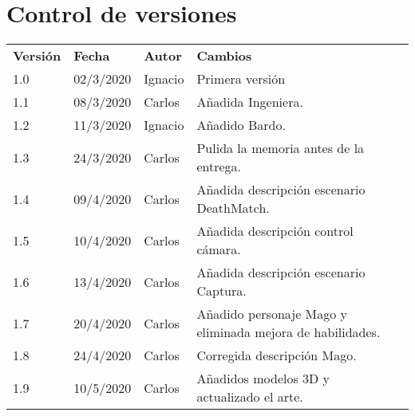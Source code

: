 \chapter{Control de versiones}
\begin{table}[h]
	\centering
	\begin{tabular}{lllll}
		\cline{1-4}
		\multicolumn{1}{|l}{\cellcolor[HTML]{C0C0C0}\textbf{Versión}} & \cellcolor[HTML]{C0C0C0}\textbf{Fecha} & \cellcolor[HTML]{C0C0C0}\textbf{Autor} & \multicolumn{1}{l|}{\cellcolor[HTML]{C0C0C0}\textbf{Cambios}} &  \\ \cline{1-4}

		\multicolumn{1}{|l}{1.0}	& 02/3/2020	& Ignacio & \multicolumn{1}{l|}{Primera versión}	&  \\ \cline{1-4}
		\multicolumn{1}{|l}{1.1}	& 08/3/2020	& Carlos  & \multicolumn{1}{l|}{Añadida Ingeniera.}	&  \\ \cline{1-4}
		\multicolumn{1}{|l}{1.2}	& 11/3/2020	& Ignacio & \multicolumn{1}{l|}{Añadido Bardo.}	    &  \\ \cline{1-4}
		\multicolumn{1}{|l}{1.3}    & 24/3/2020 & Carlos  & \multicolumn{1}{l|}{Pulida la memoria antes de la entrega.}                   &  \\ \cline{1-4}
		\multicolumn{1}{|l}{1.4}    & 09/4/2020 & Carlos  & \multicolumn{1}{l|}{Añadida descripción escenario DeathMatch.}                   &  \\ \cline{1-4}
		\multicolumn{1}{|l}{1.5}    & 10/4/2020 & Carlos  & \multicolumn{1}{l|}{Añadida descripción control cámara.}                   &  \\ \cline{1-4}
		\multicolumn{1}{|l}{1.6}    & 13/4/2020 & Carlos  & \multicolumn{1}{l|}{Añadida descripción escenario Captura.}                   &  \\ \cline{1-4}
		\multicolumn{1}{|l}{1.7}    & 20/4/2020 & Carlos  & \multicolumn{1}{l|}{Añadido personaje Mago y eliminada mejora de habilidades.}                   &  \\ \cline{1-4}
		\multicolumn{1}{|l}{1.8}    & 24/4/2020 & Carlos  & \multicolumn{1}{l|}{Corregida descripción Mago.} &  \\ \cline{1-4}
		\multicolumn{1}{|l}{1.9}    & 10/5/2020 & Carlos  & \multicolumn{1}{l|}{Añadidos modelos 3D y actualizado el arte.} &  \\ \cline{1-4}		

\end{tabular}
\end{table}
